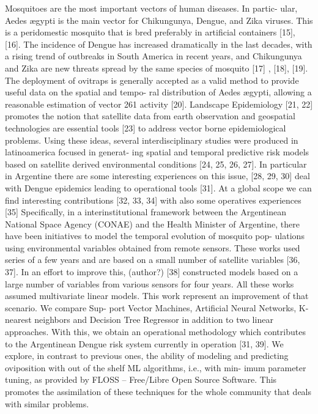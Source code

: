 Mosquitoes are the most important vectors of human diseases. In partic-
ular, Aedes ægypti is the main vector for Chikungunya, Dengue, and Zika
viruses. This is a peridomestic mosquito that is bred preferably in artificial
containers [15], [16]. The incidence of Dengue has increased dramatically
in the last decades, with a rising trend of outbreaks in South America in
recent years, and Chikungunya and Zika are new threats spread by the same
species of mosquito [17] , [18], [19]. The deployment of ovitraps is generally
accepted as a valid method to provide useful data on the spatial and tempo-
ral distribution of Aedes ægypti, allowing a reasonable estimation of vector
261 activity [20].
Landscape Epidemiology [21, 22] promotes the notion that satellite data
from earth observation and geospatial technologies are essential tools [23] to
address vector borne epidemiological problems. Using these ideas, several
interdisciplinary studies were produced in latinoamerica focused in generat-
ing spatial and temporal predictive risk models based on satellite derived
environmental conditions [24, 25, 26, 27]. In particular in Argentine there
are some interesting experiences on this issue, [28, 29, 30] deal with Dengue
epidemics leading to operational tools [31]. At a global scope we can find
interesting contributions [32, 33, 34] with also some operatives experiences
[35]
Specifically, in a interinstitutional framework between the Argentinean
National Space Agency (CONAE) and the Health Minister of Argentine,
there have been initiatives to model the temporal evolution of mosquito pop-
ulations using environmental variables obtained from remote sensors. These
works used series of a few years and are based on a small number of satellite
variables [36, 37]. In an effort to improve this, (author?) [38] constructed
models based on a large number of variables from various sensors for four
years. All these works assumed multivariate linear models.
This work represent an improvement of that scenario. We compare Sup-
port Vector Machines, Artificial Neural Networks, K-nearest neighbors and
Decision Tree Regressor in addition to two linear approaches. With this,
we obtain an operational methodology which contributes to the Argentinean
Dengue risk system currently in operation [31, 39].
We explore, in contrast to previous ones, the ability of modeling and
predicting oviposition with out of the shelf ML algorithms, i.e., with min-
imum parameter tuning, as provided by FLOSS – Free/Libre Open Source
Software. This promotes the assimilation of these techniques for the whole
community that deals with similar problems.



